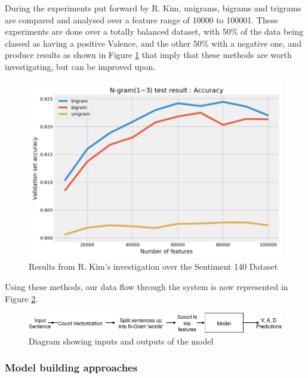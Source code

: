 During the experiments put forward by R. Kim, unigrams, bigrams and trigrams are compared and analysed over a feature range of 10000 to 100001. These experiments are done over a totally balanced dataset, with 50\% of the data being classed as having a positive Valence, and the other 50\% with a negative one, and produce results as shown in Figure \ref{towards:DS} that imply that these methods are worth investigating, but can be improved upon.

\begin{figure}[h]
\centering
\includegraphics[scale=2.5]{litImgs/towardsDSNgramNFeatures.png}
\caption{Results from R. Kim's investigation over the Sentiment 140 Dataset \cite{go2016sentiment140}}
\label{towards:DS}
\end{figure}

Using these methods, our data flow through the system is now represented in Figure \ref{model:flow}.

\begin{figure}[h]
\centering
\includegraphics[scale=0.5]{litImgs/modelFlow.png}
\caption{Diagram showing inputs and outputs of the model}
\label{model:flow}
\end{figure}


\pagebreak

\subsubsection{Model building approaches}

